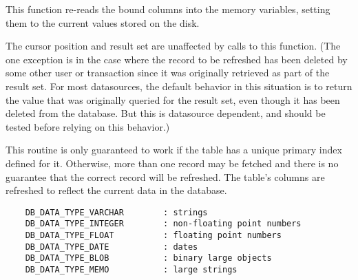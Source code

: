 
This function re-reads the bound columns into the memory variables, setting
them to the current values stored on the disk.

The cursor position and result set are unaffected by calls to this function.
(The one exception is in the case where the record to be refreshed has been
deleted by some other user or transaction since it was originally retrieved
as part of the result set.  For most datasources, the default behavior in
this situation is to return the value that was originally queried for the
result set, even though it has been deleted from the database.  But this is
datasource dependent, and should be tested before relying on this behavior.)


This routine is only guaranteed to work if the table has a unique primary
index defined for it.  Otherwise, more than one record may be fetched and
there is no guarantee that the correct record will be refreshed.  The
table's columns are refreshed to reflect the current data in the database.

\label{wxdbtablesetcoldefs}





\begin{verbatim}
    DB_DATA_TYPE_VARCHAR        : strings
    DB_DATA_TYPE_INTEGER        : non-floating point numbers
    DB_DATA_TYPE_FLOAT          : floating point numbers
    DB_DATA_TYPE_DATE           : dates
    DB_DATA_TYPE_BLOB           : binary large objects
    DB_DATA_TYPE_MEMO           : large strings
\end{verbatim}

